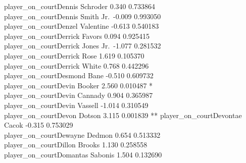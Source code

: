 \documentclass[
  landscape]{article}
\begin{document}
player\_on\_courtDennis Schroder 0.340 0.733864\\
player\_on\_courtDennis Smith Jr.~-0.009 0.993050\\
player\_on\_courtDenzel Valentine -0.613 0.540183\\
player\_on\_courtDerrick Favors 0.094 0.925415\\
player\_on\_courtDerrick Jones Jr.~-1.077 0.281532\\
player\_on\_courtDerrick Rose 1.619 0.105370\\
player\_on\_courtDerrick White 0.768 0.442296\\
player\_on\_courtDesmond Bane -0.510 0.609732\\
player\_on\_courtDevin Booker 2.560 0.010487 *\\
player\_on\_courtDevin Cannady 0.904 0.365987\\
player\_on\_courtDevin Vassell -1.014 0.310549\\
player\_on\_courtDevon Dotson 3.115 0.001839 **
player\_on\_courtDevontae Cacok -0.315 0.753029\\
player\_on\_courtDewayne Dedmon 0.654 0.513332\\
player\_on\_courtDillon Brooks 1.130 0.258558\\
player\_on\_courtDomantas Sabonis 1.504 0.132690\\
\end{document}
